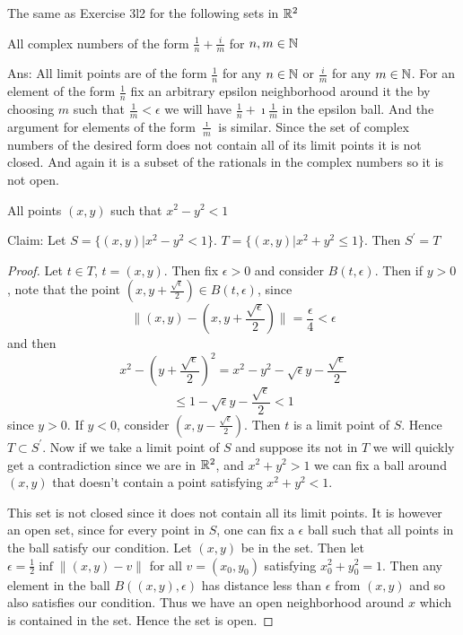     \question 
    The same as Exercise 3l2 for the following sets in $\mathbb{R}^2$ 

    \begin{alphaparts}
        \questionpart 
        All complex numbers of the form $\frac{1}{n} + \frac{i}{m}$ for $n, m \in \mathbb{N}$ 

        Ans: 
        All limit points are of the form $\frac{1}{n}$ for any $n \in \mathbb{N}$ or $\frac{i}{m}$ for any $m \in \mathbb{N}$. 
        For an element of the form $\frac{1}{n}$ fix an arbitrary epsilon neighborhood around it the by choosing $m$ such that 
        $\frac{1}{m} < \epsilon$ we will have $\frac{1}{n} + \imath \frac{1}{m}$ in the epsilon ball. And the argument for 
        elements of the form $\frac{\imath}{m}$ is similar. Since the set of complex numbers of the desired form does not contain all of 
        its limit points it is not closed. And again it is a subset of the rationals in the complex numbers so it is not open. 
        
        \questionpart
        All points $(x, y) $ such that $x^2 - y^2 < 1$ 

        Claim: Let $S = \{(x, y) | x^2 - y^2 < 1\}$. 
         $T = \{(x, y) | x^2 + y^2 \leq 1\}$.
         Then $S^\prime = T$


         \begin{proof}
            Let $t \in T$, $t = (x, y)$. Then fix $\epsilon > 0$ and consider $B(t, \epsilon)$. 
            Then if $y > 0$, note that the point $(x, y + \frac{\sqrt{\epsilon}}{2}) \in B(t, \epsilon)$, 
            since 
            \[ \| (x, y) - (x, y + \frac{\sqrt{\epsilon}}{2}) \| = \frac{\epsilon}{4} < \epsilon \]
            and then 
            \[x^2 - (y + \frac{\sqrt{\epsilon}}{2})^2 = x^2 - y^2 - \sqrt{\epsilon}y - \frac{\sqrt{\epsilon}}{2}\]
            \[\leq 1 - \sqrt{\epsilon}y - \frac{\sqrt{\epsilon}}{2} < 1\]
            since $y > 0$. If $y < 0$, consider $(x, y - \frac{\sqrt{\epsilon}}{2})$. 
            Then $t$ is a limit point of $S$. Hence $T \subset S^\prime$. 
            Now if we take a limit point of $S$ and suppose its not in $T$ we will quickly get a contradiction 
            since we are in $\mathbb{R}^2$, and $x^2 + y^2 > 1$ we can fix a ball around $(x, y)$ that doesn't contain a point 
            satisfying $x^2 + y^2 < 1$. 

            This set is not closed since it does not contain all its limit points. It is however an open set, 
            since for every point in $S$, one can fix a $\epsilon$ ball such that all points in the ball satisfy our condition. Let 
            $(x, y)$ be in the set. Then 
            let $\epsilon = \frac{1}{2}\inf{\|(x, y) - v \|}$ for all $v = (x_0, y_0)$ satisfying $x_0^2 + y_0^2 = 1$. 
            Then any element in the ball $B((x, y), \epsilon)$ has distance less than $\epsilon$ from $(x, y)$ and so also satisfies 
            our condition. Thus we have an open neighborhood around $x$ which is contained in the set. Hence the set is open. 


\end{proof}
\end{alphaparts}
